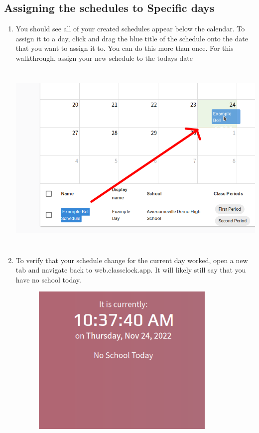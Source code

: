 \documentclass{article}
\begin{document}
\clearpage\subsection{Assigning the schedules to Specific days}
\begin{enumerate}
\item {You should see all of your created schedules appear below the calendar. To assign it to a day, click and drag the blue
title of the schedule onto the date that you want to assign it to. You can do this more than once. For this
walkthrough, assign your new schedule to the todays date\newline
}
\begin{center}
\includegraphics[width=6.5in,height=3.6807in]{Mini20Manual-img012.png}
\end{center}
\item {To verify that your schedule change for the current day worked, open a new tab and navigate back to web.classclock.app.
It will likely still say that you have no school today.}
\begin{center}
\includegraphics[width=4.4366in,height=2.8764in]{Mini20Manual-img013.png}

\end{center}
\end{enumerate}
\end{document}

